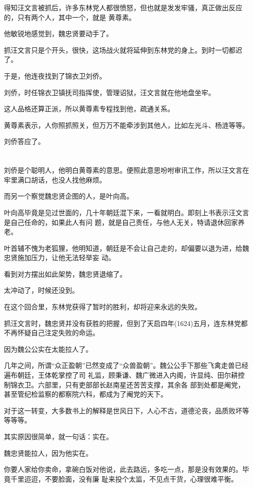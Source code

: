 \documentclass[11pt,a4paper,onecolumn]{article}
\begin{document}
得知汪文言被抓后，许多东林党人都很愤怒，但也就是发发牢骚，真正做出反应的，只有两个人，其中一个，就是
黄尊素。

他敏锐地感觉到，魏忠贤要动手了。

抓汪文言只是个开头，很快，这场战火就将延伸到东林党的身上。到时一切都迟了。

于是，他连夜找到了锦衣卫刘侨。

刘侨，时任锦衣卫镇抚司指挥使，管理诏狱，汪文言就在他地盘坐牢。

这人品格还算正派，所以黄尊素专程找到他，疏通关系。

黄尊素表示，人你照抓照关，但万万不能牵涉到其他人，比如左光斗、杨涟等等。

刘侨答应了。

\section[\thesection]{}

刘侨是个聪明人，他明白黄尊素的意思。便照此意思吩咐审讯工作，所以汪文言在牢里满口胡话，也没人找他麻烦。

而另一个察觉魏忠贤企图的人，是叶向高。

叶向高毕竟是见过世面的，几十年朝廷混下来，一看就明白。即刻上书表示汪文言是自己任命的，如果此人有问
题，就是自己责任，与他人无关，特请退休回家养老。

叶首辅不愧为老狐狸，他明知道，朝廷是不会让自己走的，却偏要以退为进，给魏忠贤施加压力，让他无法轻举妄
动。

看到对方摆出如此架势，魏忠贤退缩了。

太冲动了，时候还没到。

在这个回合里，东林党获得了暂时的胜利，却将迎来永远的失败。

抓汪文言时，魏忠贤并没有获胜的把握，但到了天启四年(1624)五月，连东林党都不再怀疑自己注定失败的命运。

因为魏公公实在太能拉人了。

几年之间，所谓``众正盈朝''已然变成了``众兽盈朝''。魏公公手下那些飞禽走兽已经遍布朝廷，王体乾掌控了司
礼监，顾秉谦、魏广微进入内阁，许显纯、田尔耕控制锦衣卫。六部里，只有吏部部长赵南星还苦苦支撑，其余各
部到处都是阉党，甚至管纪检监察的都察院六科，都成为了阉党的天下。

对于这一转变，大多数书上的解释是世风日下，人心不古，道德沦丧，品质败坏等等等等。

其实原因很简单，就一句话：实在。

魏忠贤能拉人，因为他实在。

你要人家给你卖命，拿碗白饭对他说，此去路远，多吃一点，那是没有效果的。毕竟千里迢迢，不要脸面，没有廉
耻来投个太监，不见点干货，心理很难平衡。
\end{document}
